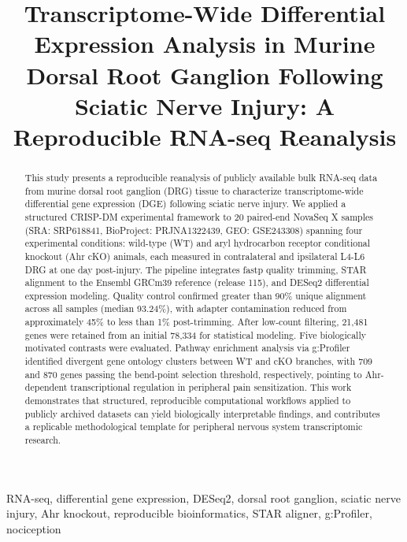 \documentclass[conference]{IEEEtran}
\begin{document}
\title{Transcriptome-Wide Differential Expression Analysis in Murine Dorsal Root Ganglion Following Sciatic Nerve Injury: A Reproducible RNA-seq Reanalysis}

\author{
}

\maketitle

\begin{abstract}
This study presents a reproducible reanalysis of publicly available bulk RNA-seq data from murine dorsal root ganglion (DRG) tissue to characterize transcriptome-wide differential gene expression (DGE) following sciatic nerve injury. We applied a structured CRISP-DM experimental framework to 20 paired-end NovaSeq X samples (SRA: SRP618841, BioProject: PRJNA1322439, GEO: GSE243308) spanning four experimental conditions: wild-type (WT) and aryl hydrocarbon receptor conditional knockout (Ahr cKO) animals, each measured in contralateral and ipsilateral L4-L6 DRG at one day post-injury. The pipeline integrates fastp quality trimming, STAR alignment to the Ensembl GRCm39 reference (release 115), and DESeq2 differential expression modeling. Quality control confirmed greater than 90\% unique alignment across all samples (median 93.24\%), with adapter contamination reduced from approximately 45\% to less than 1\% post-trimming. After low-count filtering, 21,481 genes were retained from an initial 78,334 for statistical modeling. Five biologically motivated contrasts were evaluated. Pathway enrichment analysis via g:Profiler identified divergent gene ontology clusters between WT and cKO branches, with 709 and 870 genes passing the bend-point selection threshold, respectively, pointing to Ahr-dependent transcriptional regulation in peripheral pain sensitization. This work demonstrates that structured, reproducible computational workflows applied to publicly archived datasets can yield biologically interpretable findings, and contributes a replicable methodological template for peripheral nervous system transcriptomic research.
\end{abstract}

\begin{IEEEkeywords}
RNA-seq, differential gene expression, DESeq2, dorsal root ganglion, sciatic nerve injury, Ahr knockout, reproducible bioinformatics, STAR aligner, g:Profiler, nociception
\end{IEEEkeywords}
\end{document}
